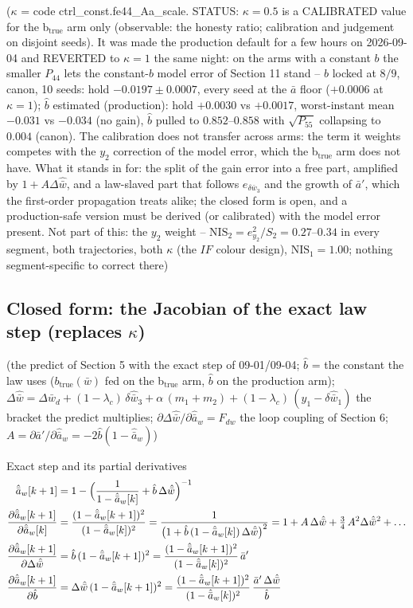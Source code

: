 \documentclass[11pt,a4paper,fontset=none]{ctexart}
\newcommand{\ba}{\bar{a}}
\newcommand{\bw}{\bar{w}}
\newcommand{\dW}{\Delta\bw}
\newcommand{\dWh}{\Delta\hat{\bw}}
\newcommand{\ap}{\ba'}
\begin{document}
($\kappa$ = code ctrl\_const.fe44\_Aa\_scale. STATUS: $\kappa = 0.5$ is a CALIBRATED value for the b$_{\mathrm{true}}$ arm only
(observable: the honesty ratio; calibration and judgement on disjoint seeds). It was made the production default for a few
hours on 2026-09-04 and REVERTED to $\kappa = 1$ the same night: on the arms with a constant $b$ the smaller $P_{44}$ lets the
constant-$b$ model error of Section 11 stand -- $b$ locked at $8/9$, canon, 10 seeds: hold $-0.0197 \pm 0.0007$, every seed at the
$\ba$ floor ($+0.0006$ at $\kappa = 1$); $\hat{b}$ estimated (production): hold $+0.0030$ vs $+0.0017$, worst-instant mean $-0.031$ vs
$-0.034$ (no gain), $\hat{b}$ pulled to $0.852$--$0.858$ with $\sqrt{P_{55}}$ collapsing to $0.004$ (canon). The calibration does not
transfer across arms: the term it weights competes with the $y_2$ correction of the model error, which the b$_{\mathrm{true}}$
arm does not have. What it stands in for: the split of the gain error into a free part, amplified by $1 + A\dWh$, and a
law-slaved part that follows $e_{\delta\bw_3}$ and the growth of $\ap$, which the first-order propagation treats alike; the
closed form is open, and a production-safe version must be derived (or calibrated) with the model error present.
Not part of this: the $y_2$ weight -- $\mathrm{NIS}_2 = e_{y_2}^2/S_2 = 0.27$--$0.34$ in every segment, both trajectories, both $\kappa$
(the $IF$ colour design), $\mathrm{NIS}_1 = 1.00$; nothing segment-specific to correct there)

\subsection*{Closed form: the Jacobian of the exact law step (replaces $\kappa$)}

(the predict of Section 5 with the exact step of 09-01/09-04; $\hat b$ = the constant the law uses ($b_{\mathrm{true}}(\bw)$ fed on the
b$_{\mathrm{true}}$ arm, $\hat b$ on the production arm); $\dWh = \dW_d + (1-\lambda_c)\,\delta\hat{\bw}_3 + \alpha\,(m_1+m_2) + (1-\lambda_c)\,(y_1 - \delta\hat{\bw}_1)$
the bracket the predict multiplies; $\partial\dWh/\partial\hat{\ba}_w = F_{dw}$ the loop coupling of Section 6; $A = \partial\ap/\partial\hat{\ba}_w = -2\hat b(1-\hat{\ba}_w)$)

Exact step and its partial derivatives
\begin{align*}
\hat{\ba}_w[k+1] &= 1 - \Bigl(\frac{1}{1-\hat{\ba}_w[k]} + \hat b\,\dWh\Bigr)^{-1} \\
\frac{\partial\hat{\ba}_w[k+1]}{\partial\hat{\ba}_w[k]} &= \frac{(1-\hat{\ba}_w[k+1])^{2}}{(1-\hat{\ba}_w[k])^{2}}
  = \frac{1}{\bigl(1 + \hat b\,(1-\hat{\ba}_w[k])\,\dWh\bigr)^{2}}
  = 1 + A\,\dWh + \tfrac{3}{4}\,A^{2}\dWh^{2} + \dots \\
\frac{\partial\hat{\ba}_w[k+1]}{\partial\dWh} &= \hat b\,(1-\hat{\ba}_w[k+1])^{2}
  = \frac{(1-\hat{\ba}_w[k+1])^{2}}{(1-\hat{\ba}_w[k])^{2}}\,\ap \\
\frac{\partial\hat{\ba}_w[k+1]}{\partial\hat b} &= \dWh\,(1-\hat{\ba}_w[k+1])^{2}
  = \frac{(1-\hat{\ba}_w[k+1])^{2}}{(1-\hat{\ba}_w[k])^{2}}\,\frac{\ap\,\dWh}{\hat b}
\end{align*}
\end{document}

